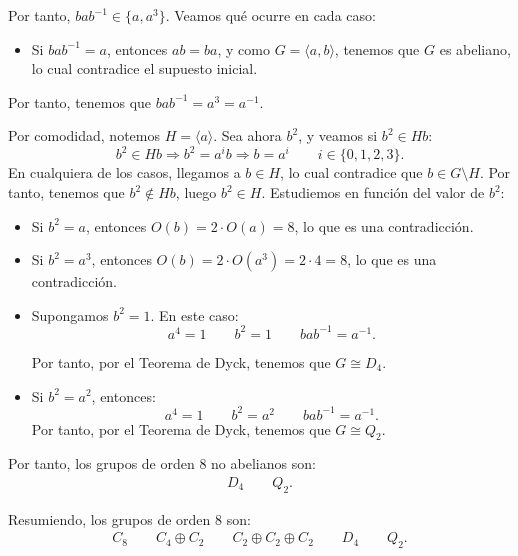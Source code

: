 \begin{ejercicio}
\begin{itemize}
        Por tanto, \(ba b^{-1}\in \{a, a^3\}\). Veamos qué ocurre en cada caso:
        \begin{itemize}
            \item Si \(bab^{-1} = a\), entonces \(ab=ba\), y como $G=\langle a, b\rangle$, tenemos que \(G\) es abeliano, lo cual contradice el supuesto inicial.
        \end{itemize}
        Por tanto, tenemos que $bab^{-1}=a^3=a^{-1}$.
    \end{itemize}

    Por comodidad, notemos $H=\langle a\rangle$. Sea ahora $b^2$, y veamos si $b^2\in Hb$:
    \begin{equation*}
        b^2\in Hb
        \Longrightarrow b^2 = a^ib \Longrightarrow b=a^i \qquad i\in \{0, 1, 2, 3\}.
    \end{equation*}
    En cualquiera de los casos, llegamos a $b\in H$, lo cual contradice que \(b\in G\setminus H\). Por tanto, tenemos que \(b^2\notin Hb\), luego \(b^2\in H\). Estudiemos en función del valor de \(b^2\):
    \begin{itemize}
        \item Si $b^2=a$, entonces $O(b)=2\cdot O(a)=8$, lo que es una contradicción.
        \item Si $b^2=a^3$, entonces $O(b)=2\cdot O(a^3)=2\cdot 4=8$, lo que es una contradicción.
        \item Supongamos $b^2=1$. En este caso:
        \begin{equation*}
            a^4 = 1\qquad
            b^2 = 1\qquad
            bab^{-1} = a^{-1}.
        \end{equation*}

        Por tanto, por el Teorema de Dyck, tenemos que \(G\cong D_4\).
        \item Si $b^2=a^2$, entonces:
        \begin{equation*}
            a^4 = 1\qquad
            b^2 = a^2\qquad
            bab^{-1} = a^{-1}.
        \end{equation*}
        Por tanto, por el Teorema de Dyck, tenemos que \(G\cong Q_2\).
    \end{itemize}

    Por tanto, los grupos de orden \(8\) no abelianos son:
    \begin{gather*}
        D_4 \qquad Q_2.
    \end{gather*}

    Resumiendo, los grupos de orden \(8\) son:
    \begin{gather*}
        C_8 \qquad C_4\oplus C_2 \qquad C_2\oplus C_2\oplus C_2 \qquad D_4 \qquad Q_2.
    \end{gather*}
\end{ejercicio}

